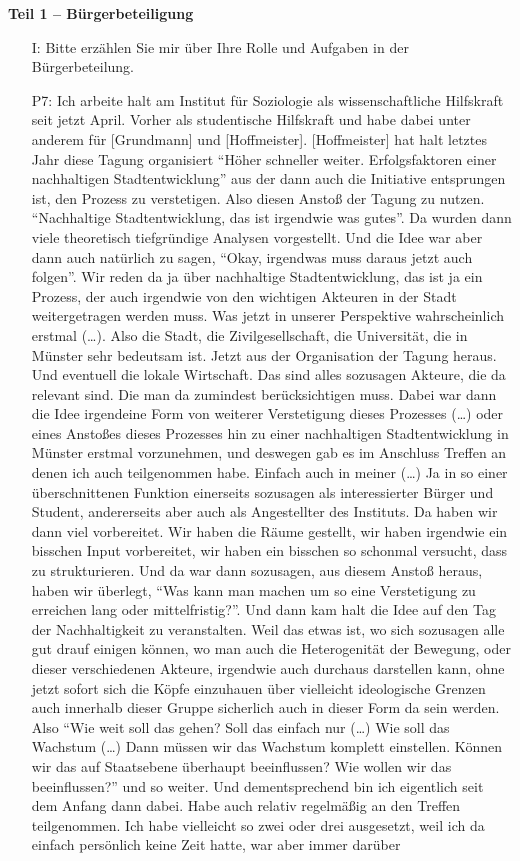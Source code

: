 \textbf{Teil 1 -- B{\"u}rgerbeteiligung}
\begin{itemize}
    \item[I:] Bitte erz{\"a}hlen Sie mir {\"u}ber Ihre Rolle und Aufgaben in der B{\"u}rgerbeteilung.
    \item[P7:] Ich arbeite halt am Institut f{\"u}r Soziologie als wissenschaftliche Hilfskraft seit jetzt April. Vorher als studentische Hilfskraft und habe dabei unter anderem f{\"u}r [Grundmann] und [Hoffmeister]. [Hoffmeister] hat halt letztes Jahr diese Tagung organisiert "`H{\"o}her schneller weiter. Erfolgsfaktoren einer nachhaltigen Stadtentwicklung"' aus der dann auch die Initiative entsprungen ist, den Prozess zu verstetigen. Also diesen Ansto{\ss} der Tagung zu nutzen. "`Nachhaltige Stadtentwicklung, das ist irgendwie was gutes"'. Da wurden dann viele theoretisch tiefgr{\"u}ndige Analysen vorgestellt. Und die Idee war aber dann auch nat{\"u}rlich zu sagen, "`Okay, irgendwas muss daraus jetzt auch folgen"'. Wir reden da ja {\"u}ber nachhaltige Stadtentwicklung, das ist ja ein Prozess, der auch irgendwie von den wichtigen Akteuren in der Stadt weitergetragen werden muss. Was jetzt in unserer Perspektive wahrscheinlich erstmal (\dots). Also die Stadt, die Zivilgesellschaft, die Universit{\"a}t, die in M{\"u}nster sehr bedeutsam ist. Jetzt aus der Organisation der Tagung heraus. Und eventuell die lokale Wirtschaft. Das sind alles sozusagen Akteure, die da relevant sind. Die man da zumindest ber{\"u}cksichtigen muss. Dabei war dann die Idee irgendeine Form von weiterer Verstetigung dieses Prozesses (\dots) oder eines Ansto{\ss}es dieses Prozesses hin zu einer nachhaltigen Stadtentwicklung in M{\"u}nster erstmal vorzunehmen, und deswegen gab es im Anschluss Treffen an denen ich auch teilgenommen habe. Einfach auch in meiner (\dots) Ja in so einer {\"u}berschnittenen Funktion einerseits sozusagen als interessierter B{\"u}rger und Student, andererseits aber auch als Angestellter des Instituts. Da haben wir dann viel vorbereitet. Wir haben die R{\"a}ume gestellt, wir haben irgendwie ein bisschen Input vorbereitet, wir haben ein bisschen so schonmal versucht, dass zu strukturieren. Und da war dann sozusagen, aus diesem Ansto{\ss} heraus, haben wir {\"u}berlegt, "`Was kann man machen um so eine Verstetigung zu erreichen lang oder mittelfristig?"'. Und dann kam halt die Idee auf den Tag der Nachhaltigkeit zu veranstalten. Weil das etwas ist, wo sich sozusagen alle gut drauf einigen k{\"o}nnen, wo man auch die Heterogenit{\"a}t der Bewegung, oder dieser verschiedenen Akteure, irgendwie auch durchaus darstellen kann, ohne jetzt sofort sich die K{\"o}pfe einzuhauen {\"u}ber vielleicht ideologische Grenzen auch innerhalb dieser Gruppe sicherlich auch in dieser Form da sein werden. Also "`Wie weit soll das gehen? Soll das einfach nur (\dots) Wie soll das Wachstum (\dots) Dann m{\"u}ssen wir das Wachstum komplett einstellen. K{\"o}nnen wir das auf Staatsebene {\"u}berhaupt beeinflussen? Wie wollen wir das beeinflussen?"' und so weiter. Und dementsprechend bin ich eigentlich seit dem Anfang dann dabei. Habe auch relativ regelm{\"a}{\ss}ig an den Treffen teilgenommen. Ich habe vielleicht so zwei oder drei ausgesetzt, weil ich da einfach pers{\"o}nlich keine Zeit hatte, war aber immer dar{\"u}ber 
\end{itemize}
